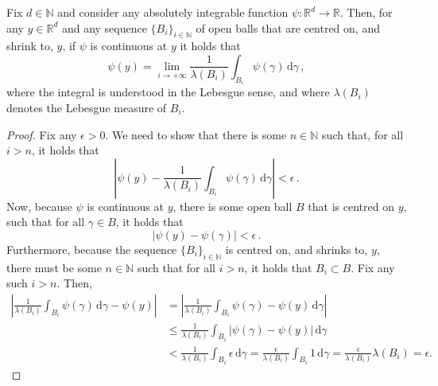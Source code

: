 \documentclass[twoside,11pt]{article}
\newcommand{\nats}{\mathbb{N}}
\newcommand{\reals}{\mathbb{R}}
\newcommand{\abs}[1]{\left\vert #1 \right\vert}
\begin{document}
\begin{lemma}\label{lemma:lebesgue_differentiation_theorem}
Fix $d\in\nats$ and consider any absolutely integrable function $\psi:\reals^d\to \reals$. Then, for any $y\in\reals^d$ and any sequence $\{B_i\}_{i\in\nats}$ of open balls that are centred on, and shrink to, $y$, if $\psi$ is continuous at $y$ it holds that
\begin{equation*}
\psi(y) = \lim_{i\to+\infty} \frac{1}{\lambda(B_i)}\int_{B_i}\psi(\gamma)\,\mathrm{d}\gamma\,,
\end{equation*}
where the integral is understood in the Lebesgue sense, and where $\lambda(B_i)$ denotes the Lebesgue measure of $B_i$.
\end{lemma}
\begin{proof}
Fix any $\epsilon>0$. We need to show that there is some $n\in\nats$ such that, for all $i>n$, it holds that
\begin{equation*}
\abs{\psi(y) - \frac{1}{\lambda(B_i)}\int_{B_i}\psi(\gamma)\,\mathrm{d}\gamma} < \epsilon\,.
\end{equation*}
Now, because $\psi$ is continuous at $y$, there is some open ball $B$ that is centred on $y$, such that for all $\gamma\in B$, it holds that
\begin{equation*}
\abs{\psi(y)-\psi(\gamma)} < \epsilon\,.
\end{equation*}
Furthermore, because the sequence $\{B_i\}_{i\in\nats}$ is centred on, and shrinks to, $y$, there must be some $n\in\nats$ such that for all $i>n$, it holds that $B_i\subset B$. Fix any such $i>n$. Then,
\begin{align*}
\abs{\frac{1}{\lambda(B_i)}\int_{B_i}\psi(\gamma)\,\mathrm{d}\gamma - \psi(y)} &= \abs{\frac{1}{\lambda(B_i)}\int_{B_i}\psi(\gamma) - \psi(y)\,\mathrm{d}\gamma} \\
 &\leq \frac{1}{\lambda(B_i)}\int_{B_i}\abs{\psi(\gamma) - \psi(y)}\,\mathrm{d}\gamma \\
 &< \frac{1}{\lambda(B_i)}\int_{B_i}\epsilon\,\mathrm{d}\gamma
 = \frac{\epsilon}{\lambda(B_i)}\int_{B_i}1\,\mathrm{d}\gamma
 = \frac{\epsilon}{\lambda(B_i)}\lambda(B_i)=\epsilon.
\end{align*}
\end{proof}
\end{document}
